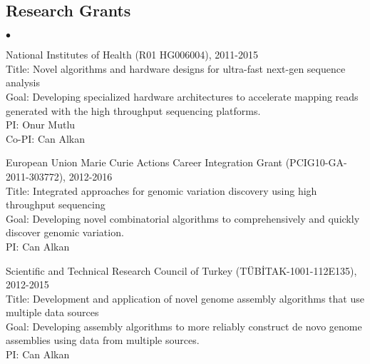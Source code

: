 \documentclass[margin,line]{res}
\newenvironment{list2}{
  \begin{list}{$\bullet$}{%
      \setlength{\itemsep}{0in}
      \setlength{\parsep}{0in} \setlength{\parskip}{0in}
      \setlength{\topsep}{0in} \setlength{\partopsep}{0in} 
      \setlength{\leftmargin}{0.2in}}}{\end{list}}
\begin{document}
\begin{resume}
                                       \section{\sc Research Grants}
                                       \begin{list2}
                                       \item
                                         National Institutes of Health (R01 HG006004), 2011-2015\\
                                         Title: Novel algorithms and hardware designs for ultra-fast next-gen sequence analysis\\
                                         Goal: Developing specialized hardware architectures to accelerate mapping reads generated with the high throughput sequencing platforms.\\
                                         PI: Onur Mutlu\\
                                         Co-PI: Can Alkan
                                         \clearpage
                                       \item
                                         European Union Marie Curie Actions Career Integration Grant (PCIG10-GA-2011-303772),  2012-2016\\
                                         Title: Integrated approaches for genomic variation discovery using high throughput sequencing\\
                                         Goal: Developing novel combinatorial algorithms to comprehensively and quickly discover genomic variation.\\
                                         PI: Can Alkan
                                       \item
                                         Scientific and Technical Research Council of Turkey (T\"{U}B\.{I}TAK-1001-112E135), 2012-2015\\
                                         Title: Development and application of novel genome assembly algorithms that use multiple data sources\\
                                         Goal: Developing assembly algorithms to more reliably construct de novo genome assemblies using data from multiple sources.\\
                                         PI: Can Alkan
                                       \item

\end{list2}
\end{resume}
\end{document}
